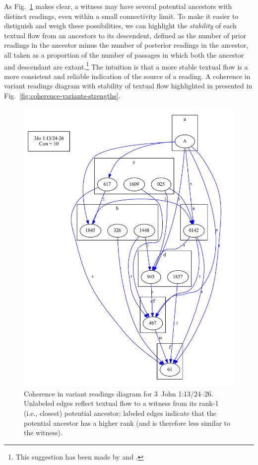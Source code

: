 \documentclass[a4paper, 12pt]{article}
\begin{document}
	As Fig.~\ref{fig:coherence-variants} makes clear, a witness may have several potential ancestors with distinct readings, even within a small connectivity limit. To make it easier to distiguish and weigh these possibilities, we can highlight the \emph{stability} of each textual flow from an ancestors to its descendent, defined as the number of prior readings in the ancestor minus the number of posterior readings in the ancestor, all taken as a proportion of the number of passages in which both the ancestor and descendant are extant.\footnote{This suggestion has been made by \cite[55--57]{Mink04} and \cite[273--279]{Edmondson19}.} The intuition is that a more stable textual flow is a more consistent and reliable indication of the source of a reading. A coherence in variant readings diagram with stability of textual flow highlighted in presented in Fig.~\ref{fig:coherence-variants-strengths}.
	
	\newpage
	
	\begin{figure}[h!]
		\centering
		\includegraphics[scale=0.65]{../graphics/B25K1V13U24-26-coherence-variants.pdf}
		\caption{Coherence in variant readings diagram for 3~John 1:13/24–26. Unlabeled edges reflect textual flow to a witness from its rank-1 (i.e., closest) potential ancestor; labeled edges indicate that the potential ancestor has a higher rank (and is therefore less similar to the witness).}
		\label{fig:coherence-variants}
	\end{figure}
	
\end{document}
